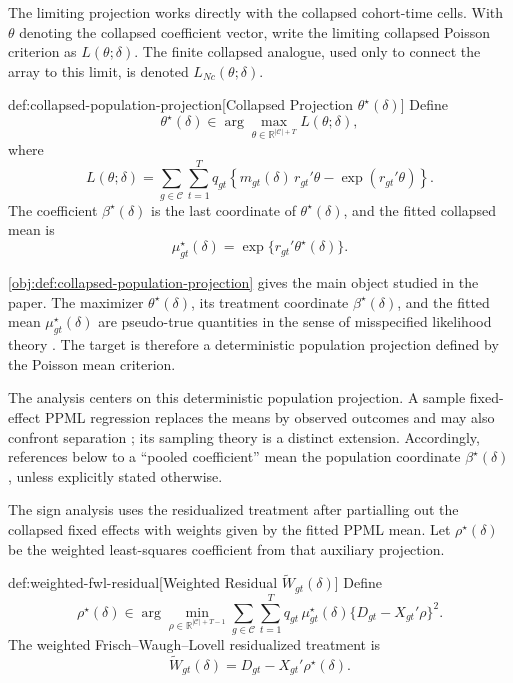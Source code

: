 The limiting projection works directly with the collapsed cohort-time cells. With \(\theta\) denoting the collapsed coefficient vector, write the limiting collapsed Poisson criterion as \(L(\theta;\delta)\). The finite collapsed analogue, used only to connect the array to this limit, is denoted \(L_{Nc}(\theta;\delta)\).

\begin{definitionv}{def:collapsed-population-projection}[Collapsed Projection \(\theta^\star(\delta)\)]
Define
\[
\theta^\star(\delta)\in
\arg\max_{\theta\in\mathbb R^{|\mathcal C|+T}} L(\theta;\delta),
\]
where
\[
L(\theta;\delta)
=
\sum_{g\in\mathcal C}\sum_{t=1}^T
q_{gt}
\left\{
m_{gt}(\delta)\,r_{gt}'\theta-\exp(r_{gt}'\theta)
\right\}.
\]
The coefficient \(\beta^\star(\delta)\) is the last coordinate of \(\theta^\star(\delta)\), and the fitted collapsed mean is
\[
\mu^\star_{gt}(\delta)=\exp\{r_{gt}'\theta^\star(\delta)\}.
\]
\end{definitionv}

\cref{obj:def:collapsed-population-projection} gives the main object studied in the paper. The maximizer \(\theta^\star(\delta)\), its treatment coordinate \(\beta^\star(\delta)\), and the fitted mean \(\mu^\star_{gt}(\delta)\) are pseudo-true quantities in the sense of misspecified likelihood theory \citep{White1982MisspecifiedML,GourierouxMonfortTrognon1984Theory,GourierouxMonfortTrognon1984Poisson}. The target is therefore a deterministic population projection defined by the Poisson mean criterion.

The analysis centers on this deterministic population projection. A sample fixed-effect PPML regression replaces the means by observed outcomes and may also confront separation \citep{SantosSilvaTenreyro2006,SantosSilvaTenreyro2011,CorreiaGuimaraesZylkin2020}; its sampling theory is a distinct extension. Accordingly, references below to a ``pooled coefficient'' mean the population coordinate \(\beta^\star(\delta)\), unless explicitly stated otherwise.

The sign analysis uses the residualized treatment after partialling out the collapsed fixed effects with weights given by the fitted PPML mean. Let \(\rho^\star(\delta)\) be the weighted least-squares coefficient from that auxiliary projection.

\begin{definitionv}{def:weighted-fwl-residual}[Weighted Residual \(\widetilde W_{gt}(\delta)\)]
Define
\[
\rho^\star(\delta)
\in
\arg\min_{\rho\in\mathbb R^{|\mathcal C|+T-1}}
\sum_{g\in\mathcal C}\sum_{t=1}^T
q_{gt}\,\mu^\star_{gt}(\delta)\{D_{gt}-X_{gt}'\rho\}^2.
\]
The weighted Frisch--Waugh--Lovell residualized treatment is
\[
\widetilde W_{gt}(\delta)=D_{gt}-X_{gt}'\rho^\star(\delta).
\]
\end{definitionv}

